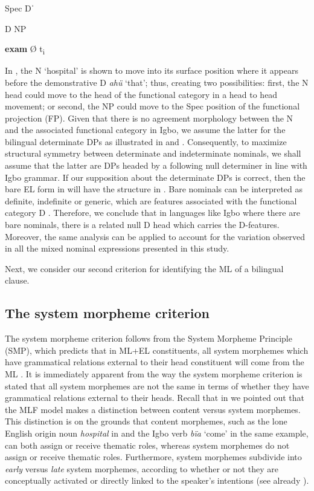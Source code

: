 \documentclass[output=paper]{langsci/langscibook}
\begin{document}
       Spec      Dˈ

      D    NP


    \textbf{exam}    Ø    t\textsubscript{i}

\z

In , the N ‘hospital’ is shown to move into its surface position where it appears before the demonstrative D \textit{ahü} ‘that’; thus, creating two possibilities: first, the N head could move to the head of the functional category in a head to head movement; or second, the NP could move to the Spec position of the functional projection (FP). Given that there is no agreement morphology between the N and the associated functional category in Igbo, we assume the latter for the bilingual determinate DPs as illustrated in  and . Consequently, to maximize structural symmetry between determinate and indeterminate nominals, we shall assume that the latter are DPs headed by a following null determiner in line with Igbo grammar. If our supposition about the determinate DPs is correct, then the bare EL form in  will have the structure in . Bare nominals can be interpreted as definite, indefinite or generic, which are features associated with the functional category D \citep{Radford2004}. Therefore, we conclude that in languages like Igbo where there are bare nominals, there is a related null D head which carries the D-features. Moreover, the same analysis can be applied to account for the variation observed in all the mixed nominal expressions presented in this study. 

Next, we consider our second criterion for identifying the ML of a bilingual clause.

\subsection{The system morpheme criterion}

The system morpheme criterion follows from the System Morpheme Principle (SMP), which predicts that in ML+EL constituents, all system morphemes which have grammatical relations external to their head constituent will come from the ML \citep[59]{MyersScotton2002}. It is immediately apparent from the way the system morpheme criterion is stated that all system morphemes are not the same in terms of whether they have grammatical relations external to their heads. Recall that in  we pointed out that the MLF model makes a distinction between content versus system morphemes. This distinction is on the grounds that content morphemes, such as the lone English origin noun \textit{hospital} in  and the Igbo verb \textit{bïa} ‘come’ in the same example, can both assign or receive thematic roles, whereas system morphemes do not assign or receive thematic roles. Furthermore, system morphemes subdivide into \textit{early} versus \textit{late} system morphemes, according to whether or not they are conceptually activated or directly linked to the speaker’s intentions (see already ). 
\end{document}
